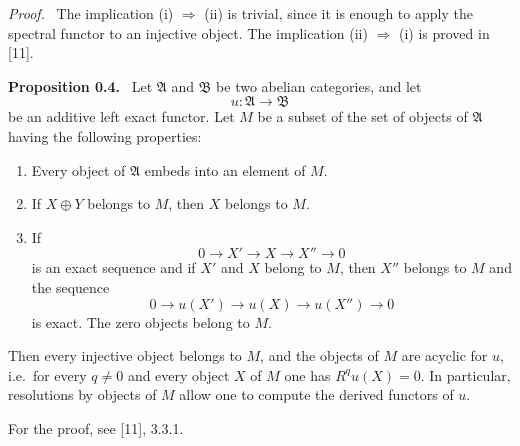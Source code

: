 \documentclass[11pt]{article}
\newcommand{\A}{\mathfrak{A}}
\newcommand{\B}{\mathfrak{B}}
\newcommand{\ie}{i.e.}
\newenvironment{statement}[1]{\par\medskip\noindent\textbf{#1.}\ }{\par\medskip}
\newenvironment{prooftext}{\par\noindent\emph{Proof.}\ }{\par\medskip}
\begin{document}
\begin{prooftext}
The implication (i) $\Rightarrow$ (ii) is trivial, since it is enough to apply the spectral functor to an injective object. The implication (ii) $\Rightarrow$ (i) is proved in [11].
\end{prooftext}

\begin{statement}{Proposition 0.4}
Let $\A$ and $\B$ be two abelian categories, and let
\[
u:\A\longrightarrow \B
\]
be an additive left exact functor. Let $M$ be a subset of the set of objects of $\A$ having the following properties:
\begin{enumerate}[label=\arabic*)]
\item Every object of $\A$ embeds into an element of $M$.
\item If $X\oplus Y$ belongs to $M$, then $X$ belongs to $M$.
\item If
\[
0\longrightarrow X'\longrightarrow X\longrightarrow X''\longrightarrow 0
\]
is an exact sequence and if $X'$ and $X$ belong to $M$, then $X''$ belongs to $M$ and the sequence
\[
0\longrightarrow u(X')\longrightarrow u(X)\longrightarrow u(X'')\longrightarrow 0
\]
is exact. The zero objects belong to $M$.
\end{enumerate}
Then every injective object belongs to $M$, and the objects of $M$ are acyclic for $u$, \ie\ for every $q\ne 0$ and every object $X$ of $M$ one has $R^q u(X)=0$. In particular, resolutions by objects of $M$ allow one to compute the derived functors of $u$.
\end{statement}

For the proof, see [11], 3.3.1.
\end{document}
